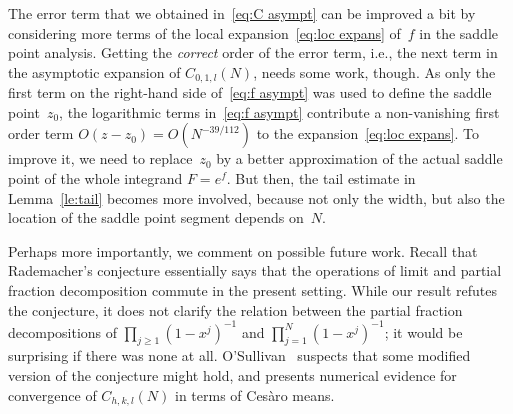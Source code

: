 \documentclass[a4paper]{amsart}
\begin{document}
The error term that we obtained in~\eqref{eq:C asympt} can be improved a bit
by considering more terms of the local expansion~\eqref{eq:loc expans}
of~$f$ in the saddle
point analysis. Getting the \emph{correct} order of the error term, i.e.,
the next term in the asymptotic expansion of $C_{0,1,l}(N)$, needs some work, though.
As only the first term on the right-hand side of~\eqref{eq:f asympt}
was used to define the saddle point~$z_0$,
the logarithmic terms in~\eqref{eq:f asympt} contribute a non-vanishing
first order term $O(z-z_0)=O(N^{-39/112})$ to the expansion~\eqref{eq:loc expans}.
To improve it, we need to
replace~$z_0$ by a better approximation of the actual saddle point
of the whole integrand $F=e^f$. But then, the tail estimate in
Lemma~\ref{le:tail} becomes more involved,
because not only the width, but also the location of the saddle point
segment depends on~$N$.

Perhaps more importantly, we comment on possible future work.
Recall that Rademacher's conjecture essentially says that the operations
of limit and partial fraction decomposition commute in the present setting.
While our result refutes the conjecture, it does not clarify the relation
between the partial fraction decompositions of $\prod_{j\geq 1}(1-x^j)^{-1}$
and $\prod_{j=1}^N(1-x^j)^{-1}$; it would be surprising if there was none at all. O'Sullivan~\cite{oS12} suspects
that some modified version of the conjecture might hold, and presents
numerical evidence for convergence of $C_{h,k,l}(N)$ in terms
of Ces{\`ar}o means.







\end{document}
